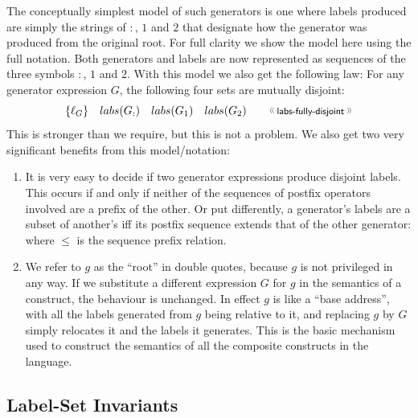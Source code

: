 The conceptually simplest model of such generators
is one where labels produced are simply the strings of $:$, $1$ and $2$
that designate how the generator was produced from the original root.
For full clarity we show the model here using the full notation.
Both generators and labels are now represented as sequences of the three symbols
$:$, $1$ and $2$.
With this model we also get the following law:
For any generator expression $G$,
the following four sets are mutually disjoint:
\[
  \setof{\ell_G}
  \quad
  labs(G_{:})
  \quad
  labs(G_1)
  \quad
  labs(G_2)
  \qquad
  \elabel{labs-fully-disjoint}
\]
This is stronger than we require, but this is not a problem.
We also get two very significant benefits from this model/notation:
\begin{enumerate}
  \item
    It is very easy to decide if two generator expressions produce
    disjoint labels.
    This occurs if and only if neither of the sequences of postfix operators
    involved are a prefix of the other.
    Or put differently, a generator's labels are a subset of another's
    iff its postfix sequence extends that of the other generator:
    where $\leq$ is the sequence prefix relation.
  \item
    We refer to $g$ as the ``root'' in double quotes,
    because $g$ is not privileged in any way.
    If we substitute a different expression $G$ for $g$
    in the semantics of a construct,
    the behaviour is unchanged.
    In effect $g$ is like a ``base address'',
    with all the labels generated from $g$ being relative to it,
    and replacing $g$ by $G$ simply relocates it and the labels it generates.
    This is the basic mechanism used to construct the semantics
    of all the composite constructs in the language.
\end{enumerate}


\subsection{Label-Set Invariants}


